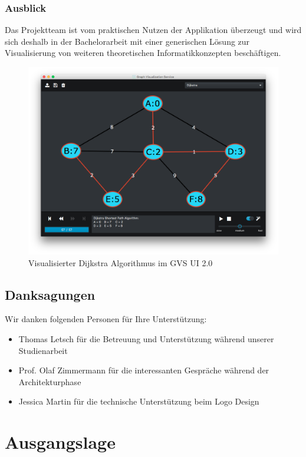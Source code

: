 \documentclass[11pt,a4paper,english,oneside]{book}
\numberwithin{equation}{chapter}
\begin{document}
	\subsection*{Ausblick}
	Das Projektteam ist vom praktischen Nutzen der Applikation überzeugt und wird sich deshalb in der Bachelorarbeit mit einer generischen Lösung zur Visualisierung von weiteren theoretischen Informatikkonzepten beschäftigen.
	
	\begin{figure}[h!]
		\centering
		\includegraphics[width=0.7\linewidth]{assets/images/gvs-overview}
		\caption{Visualisierter Dijkstra Algorithmus im GVS UI 2.0}
		\label{fig:gvs-overview}
	\end{figure}
	
	
	\newpage
	
	\section*{Danksagungen}
	\thispagestyle{firststyle}
	
	Wir danken folgenden Personen für Ihre Unterstützung:
	
	\begin{itemize}
		\item Thomas Letsch für die Betreuung und Unterstützung während unserer Studienarbeit
		\item Prof. Olaf Zimmermann für die interessanten Gespräche während der Architekturphase
		\item Jessica Martin für die technische Unterstützung beim Logo Design
	\end{itemize}
	

	{
		\hypersetup{linkcolor=black}
		\tableofcontents
	}

	\newpage
	
	
	\chapter{Ausgangslage}
	
\end{document}
